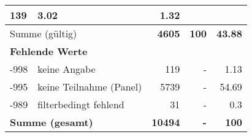 \begin{longtable}{lXrrr}
       \num{139} &
       \num[round-mode=places,round-precision=2]{3,02} &
         \num[round-mode=places,round-precision=2]{1,32} \\
     \midrule
     \multicolumn{2}{l}{Summe (gültig)} &
       \textbf{\num{4605}} &
     \textbf{100} &
       \textbf{\num[round-mode=places,round-precision=2]{43,88}} \\
     \multicolumn{5}{l}{\textbf{Fehlende Werte}}\\
       -998 &
       keine Angabe &
         \num{119} &
        - &
         \num[round-mode=places,round-precision=2]{1,13} \\
       -995 &
       keine Teilnahme (Panel) &
         \num{5739} &
        - &
         \num[round-mode=places,round-precision=2]{54,69} \\
       -989 &
       filterbedingt fehlend &
         \num{31} &
        - &
         \num[round-mode=places,round-precision=2]{0,3} \\
     \midrule
     \multicolumn{2}{l}{\textbf{Summe (gesamt)}} &
          \textbf{\num{10494}} &
        \textbf{-} &
        \textbf{100} \\
     \bottomrule
     \end{longtable}
     
